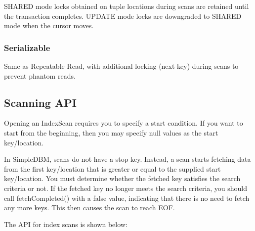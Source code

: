 \documentclass[a4paper,draft,oneside]{book}
\begin{document}
SHARED mode locks obtained on tuple locations during scans are retained until
the transaction completes. UPDATE mode locks are downgraded to SHARED mode when
the cursor moves.

\subsubsection{Serializable}

Same as Repeatable Read, with additional locking (next key) during
scans to prevent phantom reads.

\subsection{Scanning API}

Opening an IndexScan requires you to specify a start condition.
If you want to start from the beginning, then you may specify null values
as the start key/location. 

In SimpleDBM, scans do not have a stop key. Instead, a scan starts fetching
data from the first key/location that is greater or equal to the supplied
start key/location. You must determine whether the fetched key satisfies
the search criteria or not. If the fetched key no longer meets the search
criteria, you should call fetchCompleted() with a false value, indicating that
there is no need to fetch any more keys. This then causes the scan to
reach EOF.

The API for index scans is shown below:
\end{document}
